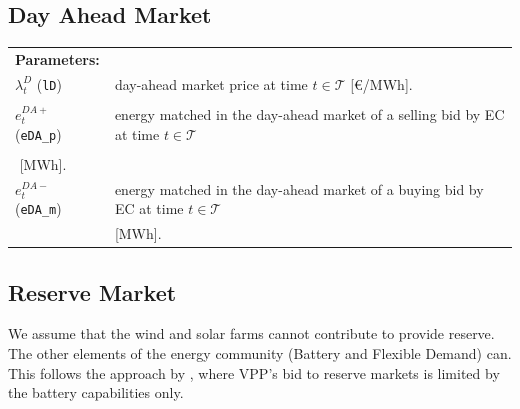 \documentclass{article}
\begin{document}
\subsection{Day Ahead Market}

\begin{tabularx}{\textwidth}{l l}
    
	\\
    \textbf{Parameters:} \\
	$\lambda^{D}_{t}$ (\verb|lD|) & day-ahead market price at time $t \in \mathcal{T}$  [\euro/MWh]. \\
       \\
	$e^{DA+}_{t}$ (\verb|eDA_p|) & energy matched in the day-ahead market of a selling bid by EC at time $t \in \mathcal{T}$ \\
    \\
	$ $ [MWh]. \\
	$e^{DA-}_{t}$ (\verb|eDA_m|) & energy matched in the day-ahead market of a buying bid by EC at time $t \in \mathcal{T}$ \\
	& [MWh]. 
    \\
\end{tabularx}


\subsection{Reserve Market}

We assume that the wind and solar farms cannot contribute to provide reserve. The other elements of the energy community (Battery and Flexible Demand) can. This follows the approach by \textcite{Heredia18}, where VPP's bid to reserve markets is limited by the battery capabilities only.

\end{document}
